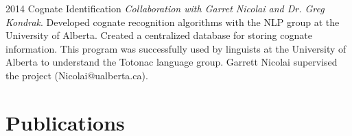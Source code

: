 \documentclass[a4paper]{cv-friggeri}
\begin{document}
\begin{entrylist}

\entry
{2014}
{Cognate Identification}
{}
{\emph{Collaboration with Garret Nicolai and Dr. Greg Kondrak}. Developed cognate recognition algorithms with the NLP group at the University of Alberta. Created a centralized database for storing cognate information. This program was successfully used by linguists at the University of Alberta to understand the Totonac language group. Garrett Nicolai supervised the project (Nicolai@ualberta.ca).}

\end{entrylist}


\section{Publications}

\cite{mscthesis}
\cite{largesetsroughpatterns}
\cite{notesfromthemargin}






\end{document}
